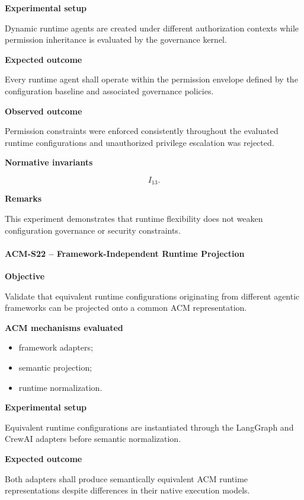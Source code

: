 \documentclass[10pt]{article}
\begin{document}
\textbf{Experimental setup}

Dynamic runtime agents are created under different authorization contexts while
permission inheritance is evaluated by the governance kernel.

\textbf{Expected outcome}

Every runtime agent shall operate within the permission envelope defined by the
configuration baseline and associated governance policies.

\textbf{Observed outcome}

Permission constraints were enforced consistently throughout the evaluated
runtime configurations and unauthorized privilege escalation was rejected.

\textbf{Normative invariants}

\[
I_{13}.
\]

\textbf{Remarks}

This experiment demonstrates that runtime flexibility does not weaken
configuration governance or security constraints.

\paragraph{ACM-S22 -- Framework-Independent Runtime Projection}

\textbf{Objective}

Validate that equivalent runtime configurations originating from different
agentic frameworks can be projected onto a common ACM representation.

\textbf{ACM mechanisms evaluated}

\begin{itemize}
    \item framework adapters;
    \item semantic projection;
    \item runtime normalization.
\end{itemize}

\textbf{Experimental setup}

Equivalent runtime configurations are instantiated through the LangGraph and
CrewAI adapters before semantic normalization.

\textbf{Expected outcome}

Both adapters shall produce semantically equivalent ACM runtime
representations despite differences in their native execution models.
\end{document}
